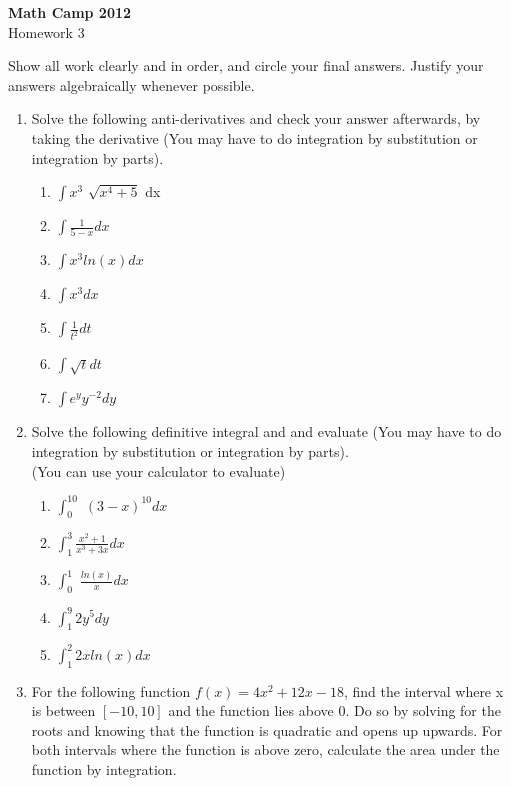 \documentclass[11pt,epsfig]{article}
\begin{document}
\textbf{Math Camp 2012} \\
\vspace{2in}
Homework 3\hspace{1.9in}  {\underline {\hspace{2.5in}}}
\vspace{2pc}

Show all work clearly and in order, and circle your final answers.  
Justify your answers algebraically whenever possible.
\vspace{2pc}

\begin{enumerate}
\item Solve the following anti-derivatives and check your answer afterwards, by taking the derivative (You may have to do integration by substitution or integration by parts). \\
\begin{enumerate}
\item $ \int x^3$ $ \sqrt{x^4 +5}$ dx
\item $ \int \frac{1}{5-x} dx $
\item $ \int x^3 ln(x) dx $
\item $ \int x^3 dx$
\item $ \int \frac{1}{t^2} dt$ 
\item $ \int \sqrt{t} dt$
\item $ \int e^y y^{-2} dy$
\end{enumerate}

\item Solve the following definitive integral and and evaluate (You may have to do integration by substitution or integration by parts).\\
(You can use your calculator to evaluate)\\
\begin{enumerate}
\item $ \int^{10}_{0} $ $ (3-x)^{10} dx$
\item $ \int^3_1 $$ \frac{x^2+1}{x^3+3x} dx$
\item $ \int^1_0 $ $ \frac{ln(x)}{x} dx $
\item $\int_1^9 2 y^5 dy$ 
\item $\int_1^2 2x ln(x) dx $
\end{enumerate}
\item For the following function $f(x) = 4 x^2 + 12x -18$, find the interval where x is between  $ [ -10,10]  $ and the function lies above 0. Do so by solving for the roots and knowing that the function is quadratic and opens up upwards. For both intervals where the function is above zero, calculate the area under the function by integration.
\end{enumerate}
\end{document}
